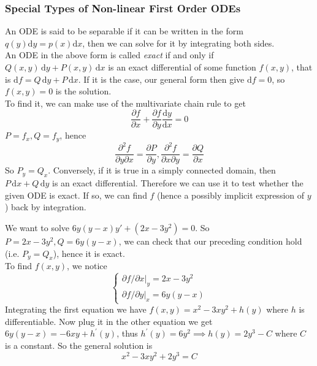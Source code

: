 \subsubsection{Special Types of Non-linear First Order ODEs}
An ODE is said to be separable if it can be written in the form $q(y)\mathrm dy=p(x)\mathrm dx$, then we can solve for it by integrating both sides.\\
An ODE in the above form is called \textit{exact} if and only if $Q(x,y)\,\mathrm dy+P(x,y)\,\mathrm dx$ is an exact differential of some function $f(x,y)$, that is $\mathrm df=Q\,\mathrm dy+P\,\mathrm dx$.
If it is the case, our general form then give $\mathrm df=0$, so $f(x,y)=0$ is the solution.\\
To find it, we can make use of the multivariate chain rule to get
$$\frac{\partial f}{\partial x}+\frac{\partial f}{\partial y}\frac{\mathrm dy}{\mathrm dx}=0$$
$P=f_x,Q=f_y$, hence
$$\frac{\partial^2f}{\partial y\partial x}=\frac{\partial P}{\partial y},\frac{\partial^2f}{\partial x\partial y}=\frac{\partial Q}{\partial x}$$
So $P_y=Q_x$.
Conversely, if it is true in a simply connected domain, then $P\,\mathrm dx+Q\,\mathrm dy$ is an exact differential.
Therefore we can use it to test whether the given ODE is exact.
If so, we can find $f$ (hence a possibly implicit expression of $y$) back by integration.
\begin{example}
    We want to solve $6y(y-x)y'+(2x-3y^2)=0$.
    So $P=2x-3y^2,Q=6y(y-x)$, we can check that our preceding condition hold (i.e. $P_y=Q_x$), hence it is exact.\\
    To find $f(x,y)$, we notice
    $$
    \begin{cases}
        \left.\partial f/\partial x\right|_y=2x-3y^2\\
        \left.\partial f/\partial y\right|_x=6y(y-x)
    \end{cases}
    $$
    Integrating the first equation we have $f(x,y)=x^2-3xy^2+h(y)$ where $h$ is differentiable.
    Now plug it in the other equation we get $6y(y-x)=-6xy+h^\prime(y)$, thus $h^\prime(y)=6y^2\implies h(y)=2y^3-C$ where $C$ is a constant.
    So the general solution is
    $$x^2-3xy^2+2y^3=C$$
\end{example}
